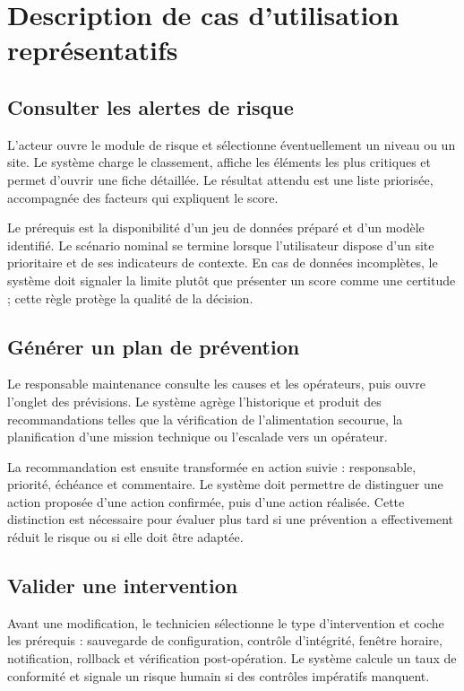 \documentclass[12pt,a4paper,oneside]{report}
\begin{document}
\section{Description de cas d’utilisation représentatifs}

\subsection{Consulter les alertes de risque}

L’acteur ouvre le module de risque et sélectionne éventuellement un niveau ou un site. Le système charge le classement, affiche les éléments les plus critiques et permet d’ouvrir une fiche détaillée. Le résultat attendu est une liste priorisée, accompagnée des facteurs qui expliquent le score.

Le prérequis est la disponibilité d’un jeu de données préparé et d’un modèle identifié. Le scénario nominal se termine lorsque l’utilisateur dispose d’un site prioritaire et de ses indicateurs de contexte. En cas de données incomplètes, le système doit signaler la limite plutôt que présenter un score comme une certitude ; cette règle protège la qualité de la décision.

\subsection{Générer un plan de prévention}

Le responsable maintenance consulte les causes et les opérateurs, puis ouvre l’onglet des prévisions. Le système agrège l’historique et produit des recommandations telles que la vérification de l’alimentation secourue, la planification d’une mission technique ou l’escalade vers un opérateur.

La recommandation est ensuite transformée en action suivie : responsable, priorité, échéance et commentaire. Le système doit permettre de distinguer une action proposée d’une action confirmée, puis d’une action réalisée. Cette distinction est nécessaire pour évaluer plus tard si une prévention a effectivement réduit le risque ou si elle doit être adaptée.

\subsection{Valider une intervention}

Avant une modification, le technicien sélectionne le type d’intervention et coche les prérequis : sauvegarde de configuration, contrôle d’intégrité, fenêtre horaire, notification, rollback et vérification post-opération. Le système calcule un taux de conformité et signale un risque humain si des contrôles impératifs manquent.
\end{document}
